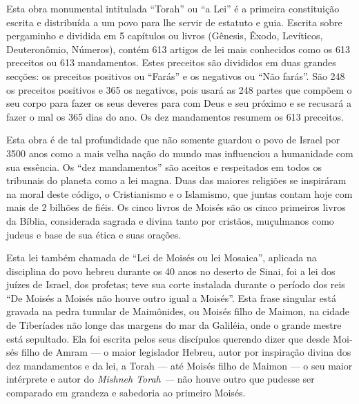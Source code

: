 Esta obra monumental intitulada ``Torah'' ou ``a Lei'' é a primeira
cons­tituição escrita e distribuída a um povo para lhe servir de
estatuto e guia. Escrita sobre pergaminho e dividida em 5 capítulos ou
livros (Gênesis, Êxodo, Levíticos, Deuteronômio, Números), contém 613
artigos de lei mais conhecidos como os 613 preceitos ou 613 mandamentos.
Estes preceitos são divididos em duas grandes sec­ções: os preceitos
positivos ou ``Farás'' e os negativos ou ``Não farás''. São 248 os preceitos
positivos e 365 os negativos, pois usará as 248 partes que compõem o seu
corpo para fazer os seus deveres para com Deus e seu próximo e se
recusará a fazer o mal os 365 dias do ano. Os dez mandamentos resumem os
613 preceitos.

Esta obra é de tal profundidade que não somente guardou o povo de Israel
por 3500 anos como a mais velha nação do mundo mas influenciou a
huma­nidade com sua essência. Os ``dez mandamentos'' são aceitos e
respeitados em to­dos os tribunais do planeta como a lei magna. Duas das
maiores religiões se inspirá­ram na moral deste código, o Cristianismo e
o Islamismo, que juntas contam hoje com mais de 2 bilhões de fiéis. Os
cinco livros de Moisés são os cinco primeiros livros da Bíblia,
considerada sagrada e divina tanto por cristãos, muçulmanos como judeus
e base de sua ética e suas orações.

Esta lei também chamada de ``Lei de Moisés ou lei Mosaica'', aplicada na
disciplina do povo hebreu durante os 40 anos no deserto de Sinai, foi a
lei dos juízes de Israel, dos profetas; teve sua corte instalada durante
o período dos reis
``De Moisés a Moisés não houve outro igual a Moisés''. Esta frase
singu­lar está gravada na pedra tumular de Maimônides, ou Moisés filho
de Maimon, na cidade de Tiberíades não longe das margens do mar da
Galiléia, onde o grande mestre está sepultado. Ela foi escrita pelos
seus discípulos querendo dizer que desde Moi­sés filho de Amram --- o
maior legislador Hebreu, autor por inspiração divina dos dez mandamentos
e da lei, a Torah --- até Moisés filho de Maimon --- o seu maior
intérprete e autor do \emph{Mishneh Torah ---} não houve outro que
pudesse ser compara­do em grandeza e sabedoria ao primeiro Moisés.


